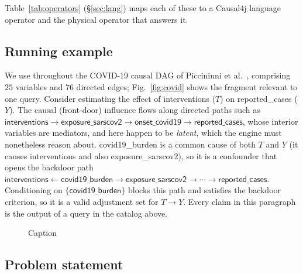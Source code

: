 Table~\ref{tab:operators} (\S\ref{sec:lang}) maps each of these to a Causal4j
language operator and the physical operator that answers it.

\subsection{Running example}\label{sec:bg:example}

We use throughout the COVID-19 causal DAG of Piccininni et
al.~\cite{piccininni2020covid}, comprising $25$ variables and $76$ directed
edges; Fig.~\ref{fig:covid} shows the fragment relevant to one query. Consider
estimating the effect of \textsf{interventions} ($T$) on
\textsf{reported\_cases} ($Y$). The causal (front-door) influence flows along
directed paths such as
$\textsf{interventions}\!\rightarrow\!\textsf{exposure\_sarscov2}\!\rightarrow\!
\textsf{onset\_covid19}\!\rightarrow\!\textsf{reported\_cases}$, whose interior
variables are mediators, and here happen to be \emph{latent}, which the engine
must nonetheless reason about. \textsf{covid19\_burden} is a common cause of both
$T$ and $Y$ (it causes \textsf{interventions} and also
\textsf{exposure\_sarscov2}), so it is a confounder that opens the backdoor path
$\textsf{interventions}\!\leftarrow\!\textsf{covid19\_burden}\!\rightarrow\!
\textsf{exposure\_sarscov2}\!\rightarrow\!\cdots\!\rightarrow\!\textsf{reported\_cases}$.
Conditioning on $\{\textsf{covid19\_burden}\}$ blocks this path and satisfies the
backdoor criterion, so it is a valid adjustment set for $T\!\rightarrow\!Y$. Every
claim in this paragraph is the output of a query in the catalog above.

\begin{figure}
    \centering
    
    \caption{Caption}
    \label{fig:example}
\end{figure}


\subsection{Problem statement}\label{sec:bg:problem}

